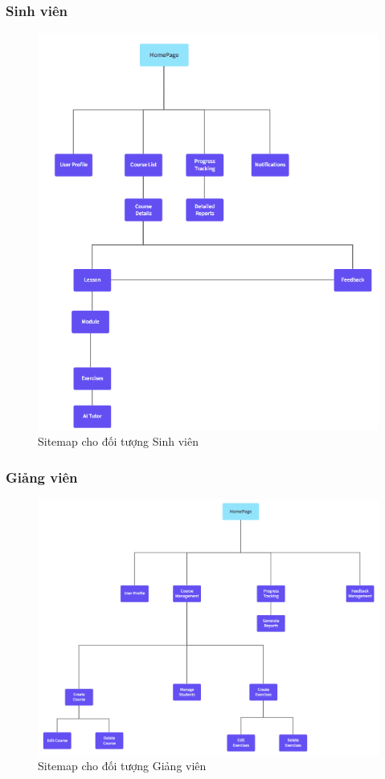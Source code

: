 \subsubsection{Sinh viên}
\begin{figure}[H]
    \centering
    \includegraphics[scale=0.8]{Images/sitemap/Student.png}
    \caption{Sitemap cho đối tượng Sinh viên}
    \label{fig:enter-label}
\end{figure}
\subsubsection{Giảng viên}
\begin{figure}[H]
    \centering
    \includegraphics[scale=0.7]{Images/sitemap/Instructor.png}
    \caption{Sitemap cho đối tượng Giảng viên}
    \label{fig:enter-label}
\end{figure}
